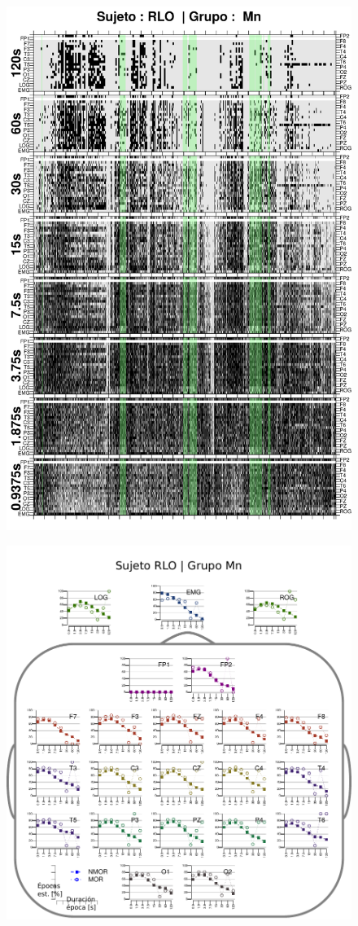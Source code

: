 \begin{figure}
\centering
\includegraphics[width=0.9\linewidth]
{./img_ejemplos/RLMN10SUE_comp_est_.png} 
\end{figure}

\begin{figure}
\centering
\includegraphics[width=.9\linewidth]{./img_resultados/cabeza_RLO.pdf}
\end{figure}


